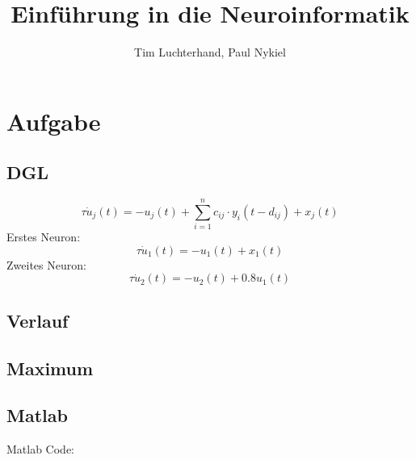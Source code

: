 \documentclass[DIN, pagenumber=false, fontsize=11pt, parskip=half]{scrartcl}
\title{Einführung in die Neuroinformatik}
\author{Tim Luchterhand, Paul Nykiel}
\begin{document}
    \maketitle
    \section{Aufgabe}
    \subsection{DGL}
    \begin{equation*}
        \tau \dot{u}_j(t) = -u_j(t) + \sum_{i=1}^n c_{ij} \cdot y_i(t-d_{ij}) + x_j(t)
    \end{equation*}
    Erstes Neuron:
    \begin{equation*}
        \tau \dot{u}_1(t) = -u_1(t) + x_1(t)
    \end{equation*}
    Zweites Neuron:
    \begin{equation*}
        \tau \dot{u}_2(t) = -u_2(t) + 0.8 u_1(t) 
    \end{equation*}
    \subsection{Verlauf}
    \subsection{Maximum}

    \subsection{Matlab}
    Matlab Code:
    
    
\end{document}
